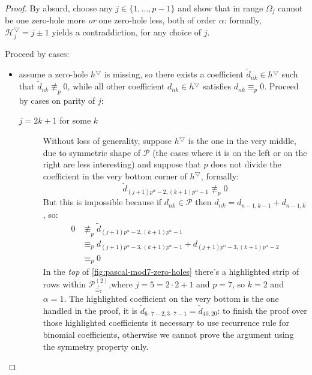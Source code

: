 \begin{proof}
    By absurd, choose any $j\in \lbrace 1, \ldots, p-1 \rbrace$ and show
    that in range $\Omega_{j}$ cannot be one zero-hole more \emph{or} one zero-hole less,
    both of order $\alpha$: formally, $\mathcal{H}_{j}^{\bigtriangledown}=j\pm1$ yields a contraddiction, 
    for any choice of $j$.

    Proceed by cases:
    \begin{itemize}
        \item assume a zero-hole $h^{\bigtriangledown}$ is missing, so there exists a coefficient
                $\tilde{d}_{nk}\in h^{\bigtriangledown}$ such that $\tilde{d}_{nk}\not\equiv_{p}0$, while all 
                other coefficient $d_{nk}\in h^{\bigtriangledown}$ satisfies $d_{nk} \equiv_{p}0$.
                Proceed by cases on parity of $j$:
            \begin{description}
                \item[$j=2k+1$ for some $k$] Without loss of generality, suppose $h^{\bigtriangledown}$ is the one in the 
                very middle, due to symmetric shape of $\mathcal{P}$ (the cases where it is on the left or 
                on the right are less interesting) and
                suppose that $p$ does not divide the coefficient in the very bottom corner of $h^{\bigtriangledown}$, 
                formally:
                \begin{displaymath}
                    \tilde{d}_{(j+1) p^{\alpha} -2, (k+1)p^{\alpha} -1}\not\equiv_{p}0
                \end{displaymath}
                But this is impossible because if $d_{nk}\in \mathcal{P}$ 
                then $d_{nk} = d_{n-1,k-1} + d_{n-1, k}$, so:
                \begin{displaymath}
                    \begin{split}
                        0&\not\equiv_{p}\tilde{d}_{(j+1) p^{\alpha} -2, (k+1)p^{\alpha} -1} \\
                        &\equiv_{p} d_{(j+1) p^{\alpha} -3, (k+1)p^{\alpha} -1} + d_{(j+1) p^{\alpha} -3, (k+1)p^{\alpha}-2 }\\
                        &\equiv_{p}0
                    \end{split}
                \end{displaymath}
                In the \emph{top} of \autoref{fig:pascal-mod7-zero-holes} there's a highlighted strip of rows 
                within $\mathcal{P}_{\stackrel{\circ}{\equiv_{7}}}^{(2)}$,where $j=5=2\cdot2+1$ and $p=7$, so $k=2$
                and $\alpha=1$.
                The highlighted coefficient on the very bottom is the one handled in the proof, it is 
                $\tilde{d}_{6\cdot 7-2, 3\cdot 7 -1}=\tilde{d}_{40, 20}$: to finish the proof over 
                those highlighted coefficients it necessary to use recurrence rule for binomial coefficients,
                otherwise we cannot prove the argument using the symmetry property only. 


\end{description}
\end{itemize}
\end{proof}
